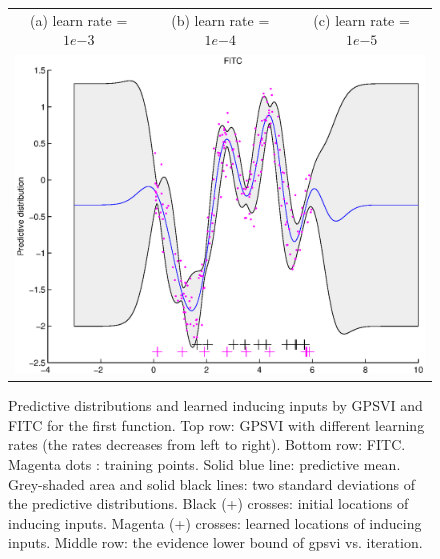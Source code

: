\documentclass{article} %
\begin{document}
\begin{figure}
\begin{tabular}{ccc}
(a) learn rate = $1e{-3}$ & (b) learn rate = $1e{-4}$ & (c) learn rate = $1e{-5}$ \\
\multicolumn{3}{c}{\includegraphics[scale=0.4]{figures/func1-fitc.eps}}
\end{tabular}
\caption{Predictive distributions and learned inducing inputs by GPSVI and FITC for the first function. Top row: GPSVI with different learning rates (the rates decreases from left to right). Bottom row: FITC. Magenta dots : training points. Solid blue line: predictive mean. Grey-shaded area and solid black lines: two standard deviations of the predictive distributions. Black (+) crosses: initial locations of inducing inputs. Magenta (+) crosses: learned locations of inducing inputs.  Middle row: the evidence lower bound of gpsvi vs. iteration.}
\label{fig1}
\end{figure}
\end{document}
